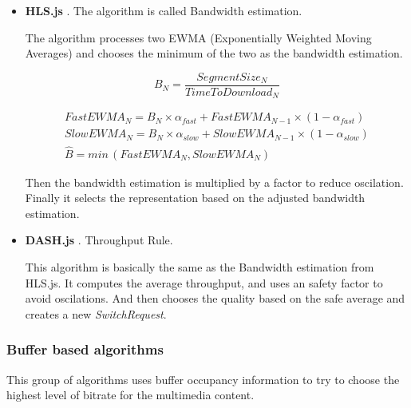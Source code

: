 \begin{itemize}
  \item \textbf{HLS.js} \cite{hls3}. The algorithm is called Bandwidth estimation. 
  
  The algorithm processes two EWMA (Exponentially Weighted Moving Averages) and chooses the minimum of the two 
  as the bandwidth estimation.

  \begin{equation}
    B_{N} = \frac{SegmentSize_{N}}{TimeToDownload_{N}} 
  \end{equation}


  \begin{gather}
    FastEWMA_{N} = B_{N} \times \alpha _{fast} +  FastEWMA_{N-1} \times (1 - \alpha _{fast}) \\
    SlowEWMA_{N} = B_{N} \times \alpha _{slow} +  SlowEWMA_{N-1} \times (1 - \alpha _{slow}) \\
    \hat{B} = min \,(FastEWMA_{N}, SlowEWMA_{N})
  \end{gather}

  Then the bandwidth estimation is multiplied by a factor to reduce oscilation. Finally it selects the 
  representation based on the adjusted bandwidth estimation. 



  \item \textbf{DASH.js} \cite{dash3}. Throughput Rule.
  
  This algorithm is basically the same as the Bandwidth estimation from HLS.js.
  It computes the average throughput, and uses an safety factor to avoid oscilations. And then chooses the quality
  based on the safe average and creates a new \textit{SwitchRequest}.

  
\end{itemize}

\subsubsection{Buffer based algorithms}

This group of algorithms uses buffer occupancy information to try to choose the highest level of bitrate
for the multimedia content.

